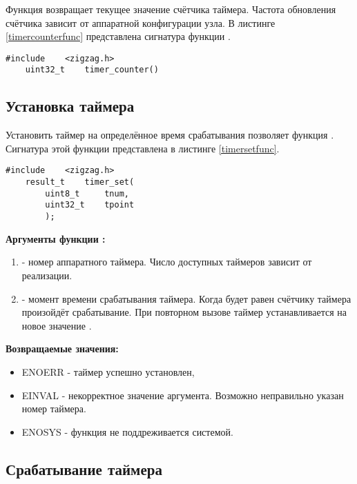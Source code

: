 Функция  возвращает текущее значение счётчика таймера. Частота обновления счётчика
зависит от аппаратной конфигурации узла. В листинге \ref{timercounterfunc} представлена сигнатура функции
.

\begin{lstlisting}[caption=Функция \myfunc{timer\_counter()} - значение счётчика., label=timercounterfunc ]
    #include    <zigzag.h>
    uint32_t    timer_counter()
\end{lstlisting}

\subsection{Установка таймера}

Установить таймер на определённое время срабатывания позволяет функция . Сигнатура
этой функции представлена в листинге \ref{timersetfunc}.

\begin{lstlisting}[caption=Функция \myfunc{timer\_set()} - установка таймера., label=timersetfunc ]
    #include    <zigzag.h>
    result_t    timer_set(
        uint8_t     tnum,
        uint32_t    tpoint
        );
\end{lstlisting}

{\bfseries Аргументы функции :}

{\itshape
\begin{enumerate}
\item {} - номер аппаратного таймера. Число доступных таймеров зависит от реализации.
\item {} - момент времени срабатывания таймера. Когда  будет равен счётчику
таймера произойдёт срабатывание. При повторном вызове  таймер устанавливается
на новое значение .
\end{enumerate}
}

{\bfseries Возвращаемые значения:}

{\itshape 
\begin{itemize}
\item ENOERR - таймер успешно установлен,
\item EINVAL - некорректное значение аргумента. Возможно неправильно указан номер таймера.
\item ENOSYS - функция не поддреживается системой.
\end{itemize}
}

\subsection{Срабатывание таймера}

